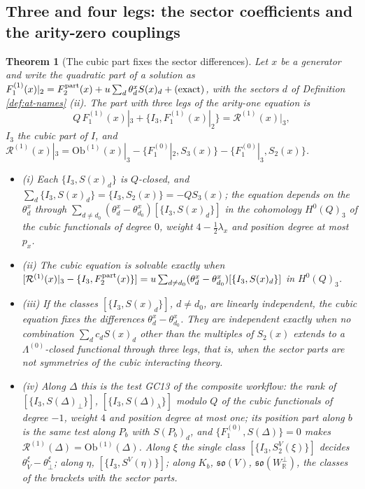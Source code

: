 \documentclass[11pt]{article}
\numberwithin{equation}{section}
\theoremstyle{plain}
\newtheorem{theorem}{Theorem}[section]
\theoremstyle{definition}
\newcommand{\Ob}{\mathrm{Ob}}
\begin{document}
\subsection{Three and four legs: the sector coefficients and the arity-zero couplings}

\begin{theorem}[The cubic part fixes the sector differences]
\label{thm:at-cubic}
Let $x$ be a generator and write the quadratic part of a solution as $F_1^{(1)}(x)|_2=F^{\rm part}_2(x)+u\sum_d\theta^x_dS(x)_d+(\text{exact})$, with the sectors $d$ of Definition \ref{def:at-names} (ii). The part with three legs of the arity-one equation is
\[
Q\,F_1^{(1)}(x)|_3+\{I_3,F_1^{(1)}(x)|_2\}=\mathcal R^{(1)}(x)|_3,
\]
$I_3$ the cubic part of $I$, and $\mathcal R^{(1)}(x)|_3=\Ob^{(1)}(x)|_3-\{F_1^{(0)}|_2,S_3(x)\}-\{F_1^{(0)}|_3,S_2(x)\}$.
\begin{itemize}
\item (i) Each $\{I_3,S(x)_d\}$ is $Q$-closed, and $\sum_d\{I_3,S(x)_d\}=\{I_3,S_2(x)\}=-QS_3(x)$; the equation depends on the $\theta^x_d$ through $\sum_{d\ne d_0}(\theta^x_d-\theta^x_{d_0})[\{I_3,S(x)_d\}]$ in the cohomology $H^0(Q)_3$ of the cubic functionals of degree $0$, weight $4-\tfrac12\lambda_x$ and position degree at most $p_x$.
\item (ii) The cubic equation is solvable exactly when $[\mathcal R^{(1)}(x)|_3-\{I_3,F^{\rm part}_2(x)\}]=u\sum_{d\ne d_0}(\theta^x_d-\theta^x_{d_0})[\{I_3,S(x)_d\}]$ in $H^0(Q)_3$.
\item (iii) If the classes $[\{I_3,S(x)_d\}]$, $d\ne d_0$, are linearly independent, the cubic equation fixes the differences $\theta^x_d-\theta^x_{d_0}$. They are independent exactly when no combination $\sum_dc_dS(x)_d$ other than the multiples of $S_2(x)$ extends to a $\Lambda^{(0)}$-closed functional through three legs, that is, when the sector parts are not symmetries of the cubic interacting theory.
\item (iv) Along $\Delta$ this is the test GC13 of the composite workflow: the rank of $[\{I_3,S(\Delta)_\perp\}]$, $[\{I_3,S(\Delta)_\lambda\}]$ modulo $Q$ of the cubic functionals of degree $-1$, weight $4$ and position degree at most one; its position part along $b$ is the same test along $P_b$ with $S(P_b)_d$, and $\{F_1^{(0)},S(\Delta)\}=0$ makes $\mathcal R^{(1)}(\Delta)=\Ob^{(1)}(\Delta)$. Along $\xi$ the single class $[\{I_3,S^V_2(\xi)\}]$ decides $\theta^\xi_V-\theta^\xi_\perp$; along $\eta$, $[\{I_3,S^V(\eta)\}]$; along $K_b$, $\mathfrak{so}(V)$, $\mathfrak{so}(W^\perp_{\mathbb R})$, the classes of the brackets with the sector parts.
\end{itemize}
\end{theorem}
\end{document}
